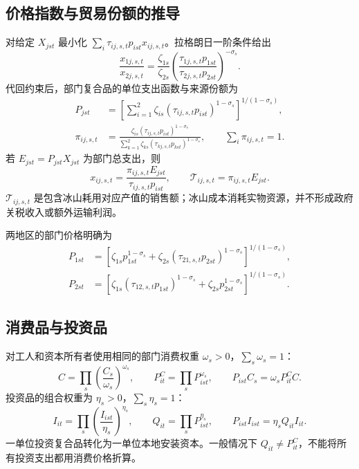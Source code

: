 \documentclass[UTF8,a4paper,zihao=-4,fontset=windows]{ctexart}
\numberwithin{equation}{section}
\newcommand{\pc}{P^{C}}
\newcommand{\invp}{Q}
\begin{document}
\subsection{价格指数与贸易份额的推导}
对给定 $X_{jst}$ 最小化 $\sum_i\tau_{ij,s,t}p_{ist}x_{ij,s,t}$。拉格朗日一阶条件给出
\begin{equation}
 \frac{x_{1j,s,t}}{x_{2j,s,t}}
 =\frac{\zeta_{1s}}{\zeta_{2s}}
 \left(\frac{\tau_{1j,s,t}p_{1st}}{\tau_{2j,s,t}p_{2st}}\right)^{-\sigma_s}.
\end{equation}
代回约束后，部门复合品的单位支出函数与来源份额为
\begin{align}
 P_{jst}&=\left[\sum_{i=1}^2\zeta_{is}
 (\tau_{ij,s,t}p_{ist})^{1-\sigma_s}\right]^{1/(1-\sigma_s)},
 \label{eq:sector-price}\\
 \pi_{ij,s,t}&=\frac{\zeta_{is}(\tau_{ij,s,t}p_{ist})^{1-\sigma_s}}
 {\sum_{k=1}^2\zeta_{ks}(\tau_{kj,s,t}p_{kst})^{1-\sigma_s}},
 \qquad \sum_i\pi_{ij,s,t}=1.
 \label{eq:trade-share}
\end{align}
若 $E_{jst}=P_{jst}X_{jst}$ 为部门总支出，则
\begin{equation}
 x_{ij,s,t}=\frac{\pi_{ij,s,t}E_{jst}}{\tau_{ij,s,t}p_{ist}},
 \qquad \mathcal T_{ij,s,t}=\pi_{ij,s,t}E_{jst}.
 \label{eq:bilateral-trade}
\end{equation}
$\mathcal T_{ij,s,t}$ 是包含冰山耗用对应产值的销售额；冰山成本消耗实物资源，并不形成政府关税收入或额外运输利润。

两地区的部门价格明确为
\begin{align}
 P_{1st}&=\left[\zeta_{1s}p_{1st}^{1-\sigma_s}
 +\zeta_{2s}(\tau_{21,s,t}p_{2st})^{1-\sigma_s}\right]^{1/(1-\sigma_s)},\\
 P_{2st}&=\left[\zeta_{1s}(\tau_{12,s,t}p_{1st})^{1-\sigma_s}
 +\zeta_{2s}p_{2st}^{1-\sigma_s}\right]^{1/(1-\sigma_s)}.
\end{align}

\subsection{消费品与投资品}
对工人和资本所有者使用相同的部门消费权重 $\omega_s>0$，$\sum_s\omega_s=1$：
\begin{equation}
 C=\prod_s\left(\frac{C_s}{\omega_s}\right)^{\omega_s},
 \qquad \pc_{it}=\prod_sP_{ist}^{\omega_s},
 \qquad P_{ist}C_s=\omega_s\pc_{it}C.
 \label{eq:consumption-price}
\end{equation}
投资品的组合权重为 $\eta_s>0$，$\sum_s\eta_s=1$：
\begin{equation}
 I_{it}=\prod_s\left(\frac{I_{ist}}{\eta_s}\right)^{\eta_s},
 \qquad \invp_{it}=\prod_sP_{ist}^{\eta_s},
 \qquad P_{ist}I_{ist}=\eta_s\invp_{it}I_{it}.
 \label{eq:investment-price}
\end{equation}
一单位投资复合品转化为一单位本地安装资本。一般情况下 $\invp_{it}\neq\pc_{it}$，不能将所有投资支出都用消费价格折算。
\end{document}
